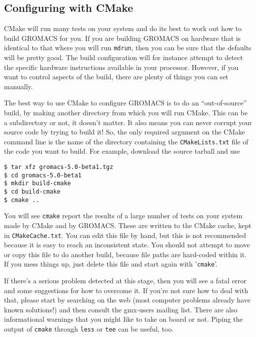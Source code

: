 \documentclass{article}[12pt,a4paper,twoside]
\newcommand{\gromacs}{GROMACS}
\newcommand{\cmake}{CMake}
\begin{document}
\subsection{Configuring with \cmake{}}

\cmake{} will run many tests on your system and do its best to work
out how to build \gromacs{} for you. If you are building \gromacs{} on
hardware that is identical to that where you will run \verb+mdrun+,
then you can be sure that the defaults will be pretty good. The build
configuration will for instance attempt to detect the specific hardware
instructions available in your processor. However, if
you want to control aspects of the build, there are plenty of things you
can set manually.

The best way to use \cmake{} to configure \gromacs{} is to do an
``out-of-source'' build, by making another directory from which you
will run \cmake{}. This can be a subdirectory or not, it doesn't
matter. It also means you can never corrupt your source code by trying
to build it! So, the only required argument on the \cmake{} command
line is the name of the directory containing the
\verb+CMakeLists.txt+ file of the code you want to build. For
example, download the source tarball and use
\begin{verbatim}
$ tar xfz gromacs-5.0-beta1.tgz
$ cd gromacs-5.0-beta1
$ mkdir build-cmake
$ cd build-cmake
$ cmake ..
\end{verbatim}

You will see \verb+cmake+ report the results of a large number of
tests on your system made by \cmake{} and by \gromacs{}. These are
written to the \cmake{} cache, kept in \verb+CMakeCache.txt+. You
can edit this file by hand, but this is not recommended because it is
easy to reach an inconsistent state. You should not attempt to move or
copy this file to do another build, because file paths are hard-coded
within it. If you mess things up, just delete this file and start
again with '\verb+cmake+'.

If there's a serious problem detected at this stage, then you will see
a fatal error and some suggestions for how to overcome it. If you're
not sure how to deal with that, please start by searching on the web
(most computer problems already have known solutions!) and then
consult the gmx-users mailing list. There are also informational
warnings that you might like to take on board or not. Piping the
output of \verb+cmake+ through \verb+less+ or \verb+tee+ can be
useful, too.
\end{document}
